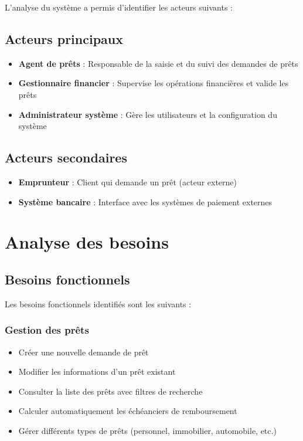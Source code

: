 \documentclass[12pt,a4paper]{report}
\begin{document}
L'analyse du système a permis d'identifier les acteurs suivants :

\subsection{Acteurs principaux}
\begin{itemize}
    \item \textbf{Agent de prêts} : Responsable de la saisie et du suivi des demandes de prêts
    \item \textbf{Gestionnaire financier} : Supervise les opérations financières et valide les prêts
    \item \textbf{Administrateur système} : Gère les utilisateurs et la configuration du système
\end{itemize}

\subsection{Acteurs secondaires}
\begin{itemize}
    \item \textbf{Emprunteur} : Client qui demande un prêt (acteur externe)
    \item \textbf{Système bancaire} : Interface avec les systèmes de paiement externes
\end{itemize}

\section{Analyse des besoins}

\subsection{Besoins fonctionnels}

Les besoins fonctionnels identifiés sont les suivants :

\subsubsection{Gestion des prêts}
\begin{itemize}
    \item Créer une nouvelle demande de prêt
    \item Modifier les informations d'un prêt existant
    \item Consulter la liste des prêts avec filtres de recherche
    \item Calculer automatiquement les échéanciers de remboursement
    \item Gérer différents types de prêts (personnel, immobilier, automobile, etc.)
\end{itemize}
\end{document}
